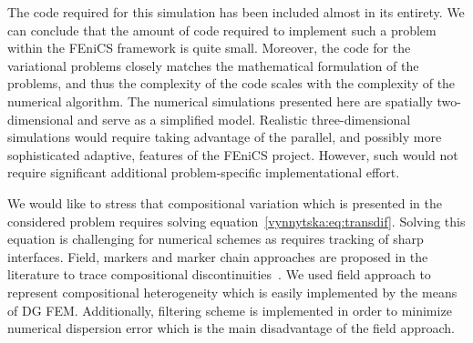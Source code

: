 The code required for this simulation has been included almost in its
entirety. We can conclude that the amount of code required to
implement such a problem within the FEniCS framework is quite
small. Moreover, the code for the variational problems closely matches
the mathematical formulation of the problems, and thus the complexity
of the code scales with the complexity of the numerical algorithm.
The numerical simulations presented here are spatially two-dimensional
and serve as a simplified model. Realistic three-dimensional
simulations would require taking advantage of the parallel, and
possibly more sophisticated adaptive, features of the FEniCS
project. However, such would not require significant additional
problem-specific implementational effort.

We would like to stress that compositional variation which is
presented in the considered problem requires solving
equation~\eqref{vynnytska:eq:transdif}.  Solving this equation is
challenging for numerical schemes as requires tracking of sharp
interfaces.  Field, markers and marker chain approaches are proposed
in the literature to trace compositional
discontinuities~\cite{IsmailZadehTackley2010}. We used field approach
to represent compositional heterogeneity which is easily implemented by
the means of DG FEM. Additionally, filtering scheme is implemented in
order to minimize numerical dispersion error which is the main
disadvantage of the field approach.


